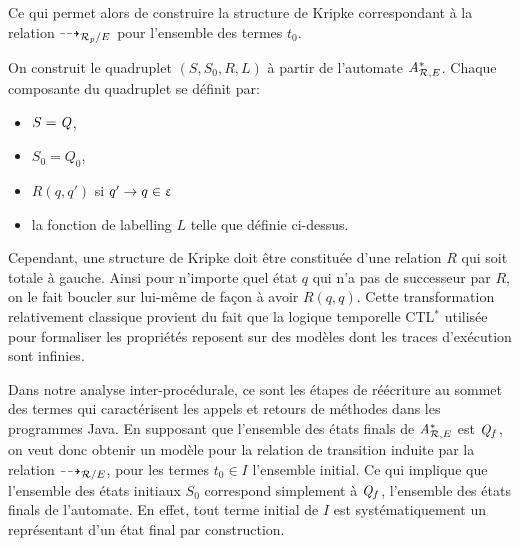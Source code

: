 Ce qui permet alors de construire la structure de Kripke correspondant à la relation $\dashrightarrow_{\mathcal R_p/E}$ pour l'ensemble des termes $t_0$.

\begin{definition}%
  On construit le quadruplet $(S, S_0, R, L)$ à partir de l'automate ${\mathit A}_{\mathcal R,E}^*$.
  Chaque composante du quadruplet se définit par:
  \begin{itemize}
  \item $S = \mathit Q$, 
  \item $S_0 = Q_0$,
  \item $R(q, q')$ si $q' \rightarrow q \in \upvarepsilon$
  \item la fonction de labelling $L$ telle que définie ci-dessus.
  \end{itemize}
\end{definition}

Cependant, une structure de Kripke doit être constituée d'une relation $R$ qui soit totale à gauche.
Ainsi pour n'importe quel état $q$ qui n'a pas de successeur par $R$, on le fait boucler sur lui-même
de façon à avoir $R(q, q)$. Cette transformation relativement classique provient du fait que
la logique temporelle CTL$^*$ utilisée pour formaliser les propriétés reposent sur des modèles dont les traces
d'exécution sont infinies.

Dans notre analyse inter-procédurale, ce sont les étapes de réécriture au sommet des termes qui caractérisent
les appels et retours de méthodes dans les programmes Java. En supposant que l'ensemble des états finals de ${\mathit A}_{\mathcal R,E}^*$ est $\mathit Q_f$,
on veut donc obtenir un modèle pour la relation de transition induite par la relation $\dashrightarrow_{\mathcal R/E}$, pour les termes $t_0 \in I$ l'ensemble initial. Ce qui implique
que l'ensemble des états initiaux $S_0$ correspond simplement à $\mathit Q_f$, l'ensemble des états finals de 
l'automate. En effet, tout terme initial de $I$ est systématiquement un représentant d'un état final par construction.

 
